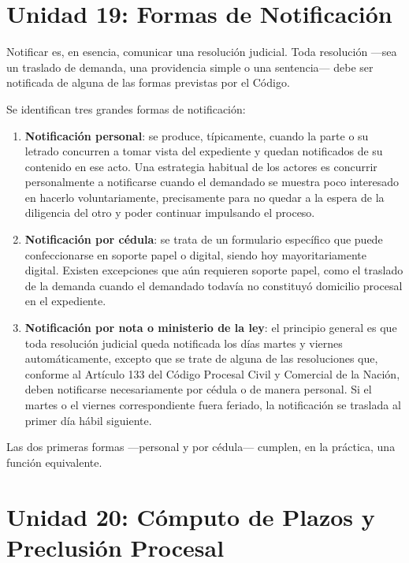 \documentclass[12pt,oneside]{book}
\begin{document}
\section{Unidad 19: Formas de Notificación}

Notificar es, en esencia, comunicar una resolución judicial. Toda resolución ---sea un traslado de demanda, una providencia simple o una sentencia--- debe ser notificada de alguna de las formas previstas por el Código.

Se identifican tres grandes formas de notificación:

\begin{enumerate}
    \item \textbf{Notificación personal}: se produce, típicamente, cuando la parte o su letrado concurren a tomar vista del expediente y quedan notificados de su contenido en ese acto. Una estrategia habitual de los actores es concurrir personalmente a notificarse cuando el demandado se muestra poco interesado en hacerlo voluntariamente, precisamente para no quedar a la espera de la diligencia del otro y poder continuar impulsando el proceso.
    
    \item \textbf{Notificación por cédula}: se trata de un formulario específico que puede confeccionarse en soporte papel o digital, siendo hoy mayoritariamente digital. Existen excepciones que aún requieren soporte papel, como el traslado de la demanda cuando el demandado todavía no constituyó domicilio procesal en el expediente.
    
    \item \textbf{Notificación por nota o ministerio de la ley}: el principio general es que toda resolución judicial queda notificada los días martes y viernes automáticamente, excepto que se trate de alguna de las resoluciones que, conforme al Artículo 133 del Código Procesal Civil y Comercial de la Nación, deben notificarse necesariamente por cédula o de manera personal. Si el martes o el viernes correspondiente fuera feriado, la notificación se traslada al primer día hábil siguiente.
\end{enumerate}

Las dos primeras formas ---personal y por cédula--- cumplen, en la práctica, una función equivalente.

\section{Unidad 20: Cómputo de Plazos y Preclusión Procesal}
\end{document}
